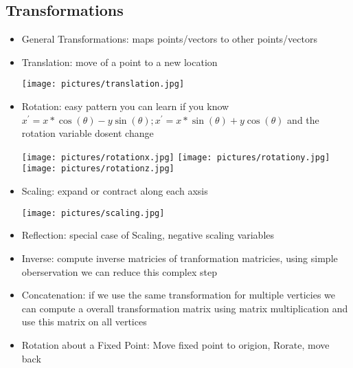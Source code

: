 \documentclass[11pt,a4paper]{article}
\begin{document}
	\subsection{Transformations}
	\begin{itemize}
		\item General Transformations: maps points/vectors to other points/vectors
		\item Translation: move of a point to a new location
		\begin{center}
			\texttt{[image: pictures/translation.jpg]}
		\end{center}
		\item Rotation: easy pattern you can learn if you know $x^{'} = x*\cos(\theta)-y\sin(\theta); x^{'} = x*\sin(\theta)+y\cos(\theta)$ and the rotation variable dosent change
		\begin{center}
			\texttt{[image: pictures/rotationx.jpg]}
			\texttt{[image: pictures/rotationy.jpg]}
			\texttt{[image: pictures/rotationz.jpg]}
		\end{center}
		\item Scaling: expand or contract along each axsis
			\begin{center}
			\texttt{[image: pictures/scaling.jpg]}
		\end{center}		
		\item Reflection: special case of Scaling, negative scaling variables
		\item Inverse: compute inverse matricies of tranformation matricies, using simple oberservation we can reduce this complex step
		\item Concatenation: if we use the same transformation for multiple verticies we can compute a overall transformation matrix using matrix multiplication and use this matrix on all vertices
		\item Rotation about a Fixed Point: Move fixed point to origion, Rorate, move back
	\end{itemize}
\end{document}
